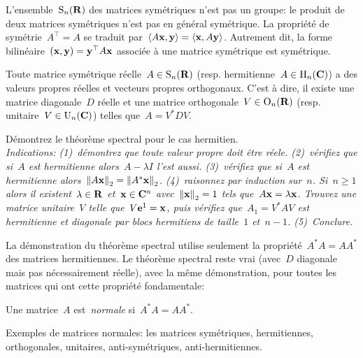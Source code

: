 L'ensemble~$\mathrm{S}_n(\mathbf{R})$ des matrices symétriques n'est pas un groupe: le produit
de deux matrices symétriques n'est pas en général symétrique.  La propriété
de symétrie~$A^\top=A$ se traduit par~$\left\langle A\mathbf{x},\mathbf{y}\right\rangle=\left\langle \mathbf{x},A\mathbf{y}\right\rangle$.
Autrement dit, la forme bilinéaire~$(\mathbf{x},\mathbf{y})=\mathbf{y}^\top A\mathbf{x}$
associée à une matrice symétrique est symétrique.

\begin{proposition}
	Toute matrice symétrique réelle~$A\in\mathrm{S}_n(\mathbf{R})$ (resp. hermitienne~$A\in
	\mathrm{H}_n(\mathbf{C})$) a des valeurs propres réelles et vecteurs propres orthogonaux.
	C'est à dire, il existe une matrice diagonale~$D$ réelle et une matrice
	orthogonale~$V\in\mathrm{O}_n(\mathbf{R})$ (resp.  unitaire~$V\in\mathrm{U}_n(\mathbf{C})$) telles
	que~$A=V^* D V$.
\end{proposition}

\begin{exercice}
	Démontrez le théorème spectral pour le cas hermitien.\\
	\emph{
	Indications: (1)~démontrez que toute valeur propre doit être réele.
	(2)\!~vérifiez que si~$A$ est hermitienne alors~$A-\lambda I$ l'est aussi.
	(3)\!~vérifiez que si~$A$ est hermitienne
	alors~$\left\|A\mathbf{x}\right\|_2=\left\|A^*\mathbf{x}\right\|_2$.
	(4)\!~raisonnez par induction sur~$n$.  Si~$n\ge 1$ alors il
	existent~$\lambda\in\mathbf{R}$ et~$\mathbf{x}\in\mathbf{C}^n$ avec~$\left\|\mathbf{x}\right\|_2=1$ tels
	que~$A\mathbf{x}=\lambda\mathbf{x}$.  Trouvez une matrice unitaire~$V$ telle
	que~$V\mathbf{e}^1=\mathbf{x}$, puis vérifiez que~$A_1=V^*AV$ est hermitienne et diagonale
	par blocs hermitiens de taille~$1$ et~$n-1$.
	(5)\!\!~Conclure.
}
\end{exercice}

La démonstration du théorème spectral utilise seulement la
propriété~$A^*A=AA^*$ des matrices hermitiennes.  Le théorème spectral reste
vrai (avec~$D$ diagonale mais pas nécessairement réelle), avec la même démonstration, pour toutes les matrices qui ont cette
propriété fondamentale:

\begin{definition}
	Une matrice~$A$ est~\emph{normale} si~$A^*A=AA^*$.
\end{definition}

Exemples de matrices normales: les matrices symétriques,
hermitiennes, orthogonales, unitaires, anti-symétriques, anti-hermitiennes.




